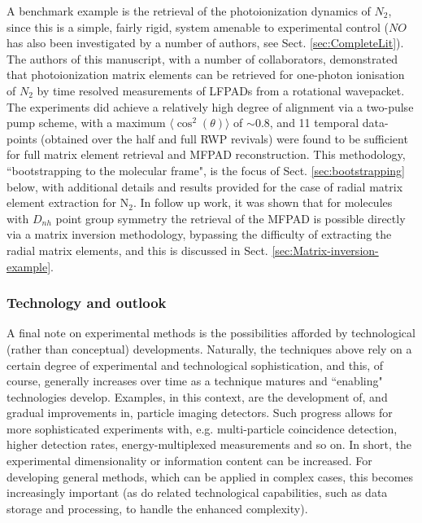 \documentclass[10pt]{article}
\begin{document}
A benchmark example is the retrieval of the photoionization dynamics of $N_2$, since this is a simple, fairly rigid, system amenable to experimental control ($NO$ has also been investigated by a number of authors, see Sect. \ref{sec:CompleteLit}). The authors of this manuscript, with a number of collaborators, demonstrated that photoionization matrix elements can be retrieved for one-photon ionisation of $N_2$ by time resolved measurements of LFPADs from a rotational wavepacket. The experiments did achieve a relatively high degree of alignment via a two-pulse pump scheme, with a maximum $\langle\cos^2(\theta)\rangle$ of $\sim 0.8$, and 11 temporal data-points (obtained over the half and full RWP revivals) were found to be sufficient for full matrix element retrieval and MFPAD reconstruction. This methodology, ``bootstrapping to the molecular frame", is the focus of Sect. \ref{sec:bootstrapping} below, with additional details and results provided for the case of radial matrix element extraction for N$_2$.  In follow up work, it was shown that for molecules with $D_{nh}$ point group symmetry the retrieval of the MFPAD is possible directly via a matrix inversion methodology, bypassing the difficulty of extracting the radial matrix elements, and this is discussed in Sect. \ref{sec:Matrix-inversion-example}.




\subsubsection{Technology and outlook}

A final note on experimental methods is the possibilities afforded by technological (rather than conceptual) developments. Naturally, the techniques above rely on a certain degree of experimental and technological sophistication, and this, of course, generally increases over time as a technique matures and ``enabling" technologies develop. Examples, in this context, are the development of, and gradual improvements in, particle imaging detectors. Such progress allows for more sophisticated experiments with, e.g. multi-particle coincidence detection, higher detection rates, energy-multiplexed measurements and so on. In short, the experimental dimensionality or information content can be increased. For developing general methods, which can be applied in complex cases, this becomes increasingly important (as do related technological capabilities, such as data storage and processing, to handle the enhanced complexity). 
\end{document}
